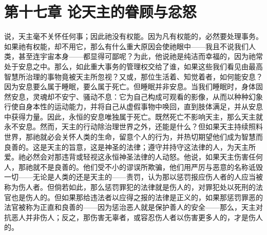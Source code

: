 
\section{第十七章 论天主的眷顾与忿怒}

说，天主毫不关怀任何事；因此祂没有权能。因为凡有权能的，必然要处理事务。如果祂有权能，却不用它，那么有什么重大原因会使祂眼中——我且不说我们人类，甚至连宇宙本身——都显得可鄙呢？\newline{}为此，他说祂是纯洁而幸福的，因为祂常处于安息之中。那么，如此重大事务的管理权交给了谁，如果这些我们看见由最高智慧所治理的事物竟被天主所忽视？\newline{}又或，那位生活着、知觉着者，如何能安息？因为安息要么属于睡眠，要么属于死亡。但睡眠并非安息。当我们睡眠时，身体固然安息，灵魂却不安宁、骚动不息：它为自己构成可观看的影像，从而以种种幻象行使自身本性的运动能力，并将自己从虚假事物中唤回，直到肢体满足，并从安息中获得力量。\newline{}因此，永恒的安息唯独属于死亡。既然死亡不影响天主，那么天主就永不安息。\newline{}然而，天主的行动除治理世界之外，还能是什么？\newline{}但如果天主持续照料世界，那祂就必会关怀人类的生命，留意个人的行为，并热切期望他们成为智慧而良善的。这是天主的旨意，这是神圣的法律；遵守并持守这法律的人，为天主所爱。\newline{}祂必然会对那违背或轻视这永恒神圣法律的人动怒。\newline{}他说，如果天主伤害任何人，那祂就不是良善的。他们受不小的谬误所欺骗，他们用严厉与恶意的名称诋毁一切——无论是人类的还是天主的——责罚，认为那以惩罚报应伤人者的人应当被称为伤人者。\newline{}但倘若如此，那么惩罚罪犯的法律就是伤人的，对罪犯处以死刑的法官也是伤人的。\newline{}但如果那给违法者以应得之报的法律是正义的，如果那惩罚罪恶的法官被称为正直和良善的——因为惩治恶人就是保护善人的安全——那么，天主对抗恶人并非伤人；反之，那伤害无辜者，或容忍伤人者以伤害更多人的，才是伤人的。\par

